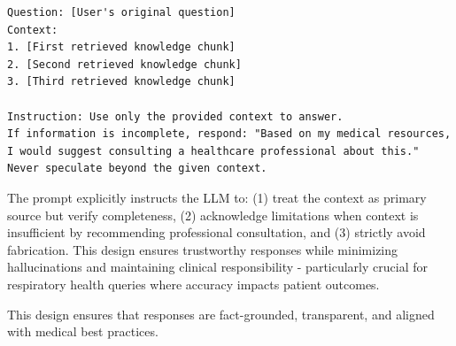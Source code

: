 \begin{verbatim}
Question: [User's original question]
Context:
1. [First retrieved knowledge chunk]
2. [Second retrieved knowledge chunk] 
3. [Third retrieved knowledge chunk]

Instruction: Use only the provided context to answer. 
If information is incomplete, respond: "Based on my medical resources, 
I would suggest consulting a healthcare professional about this."
Never speculate beyond the given context.
\end{verbatim}

The prompt explicitly instructs the LLM to: (1) treat the context as primary source but verify completeness, (2) acknowledge limitations when context is insufficient by recommending professional consultation, and (3) strictly avoid fabrication. This design ensures trustworthy responses while minimizing hallucinations and maintaining clinical responsibility - particularly crucial for respiratory health queries where accuracy impacts patient outcomes.

This design ensures that responses are fact-grounded, transparent, and aligned with medical best practices.